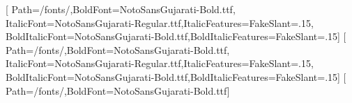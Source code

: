 \usepackage[no-math]{fontspec}
\setmainfont{NotoSansGujarati-Regular.ttf}[
  Path=\olpath/fonts/,BoldFont=NotoSansGujarati-Bold.ttf,
  ItalicFont=NotoSansGujarati-Regular.ttf,ItalicFeatures={FakeSlant=.15},
  BoldItalicFont=NotoSansGujarati-Bold.ttf,BoldItalicFeatures={FakeSlant=.15}]
\setsansfont{NotoSansGujarati-Regular.ttf}[
  Path=\olpath/fonts/,BoldFont=NotoSansGujarati-Bold.ttf,
  ItalicFont=NotoSansGujarati-Regular.ttf,ItalicFeatures={FakeSlant=.15},
  BoldItalicFont=NotoSansGujarati-Bold.ttf,BoldItalicFeatures={FakeSlant=.15}]
\setmonofont{NotoSansGujarati-Regular.ttf}[
  Path=\olpath/fonts/,BoldFont=NotoSansGujarati-Bold.ttf]
\newcommand*{\ollangid}{gu}
\newcommand*{\ollanguage}{gujarati}
\NewDocumentCommand{}
